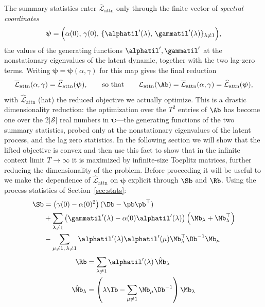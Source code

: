 \documentclass{article}
\begin{document}
The summary statistics enter $\overline{\mathcal{L}}_{\text{attn}}$ only through
the finite vector of \emph{spectral coordinates}
\begin{equation}\label{psi}
    \boldsymbol{\psi}
    = \Big(\alpha(0),\,\gamma(0),\,
      \{\alphatil'(\lambda),\,\gammatil'(\lambda)\}_{\lambda\neq 1}\Big),
\end{equation}
the values of the generating functions $\alphatil',\gammatil'$ at the
nonstationary eigenvalues of the latent dynamic, together with the two lag-zero
terms. Writing $\boldsymbol{\psi} = \boldsymbol{\psi}(\alpha,\gamma)$ for this
map gives the final reduction
\begin{equation}\label{reduce}
    \overline{\mathcal{L}}_{\text{attn}}(\alpha,\gamma)
    = \widehat{\mathcal{L}}_{\text{attn}}(\boldsymbol{\psi}),
    \qquad\text{so that}\qquad
    \mathcal{L}_{\text{attn}}(\Ab)
    = \overline{\mathcal{L}}_{\text{attn}}(\alpha,\gamma)
    = \widehat{\mathcal{L}}_{\text{attn}}(\boldsymbol{\psi}),
\end{equation}
with $\widehat{\mathcal{L}}_{\text{attn}}$ (hat) the reduced objective we
actually optimize. This is a drastic dimensionality reduction: the optimization over
the $T^2$ entries of $\Ab$ has become one over the $2|\mathcal{S}|$ real numbers
in $\boldsymbol{\psi}$---the generating functions of the two summary statistics,
probed only at the nonstationary eigenvalues of the latent process, and the lag zero statistics. In the following section we will show that the lifted objective is convex and then use this fact to show that in the infinite context limit $T \to \infty$ it is maximized by infinite-size Toeplitz matrices, further reducing the dimensionality of the problem. Before proceeding it will be useful to we make the
dependence of $\widehat{\mathcal{L}}_{\text{attn}}$ on $\boldsymbol{\psi}$
explicit through $\Sb$ and $\Rb$. Using the process statistics of Section~\ref{sec:stats}: 
\begin{align}\label{s}
      \Sb &= \left(\gamma(0) - \alpha(0)^2\right)(\Db - \pb\pb^\top)\\
      &+ \sum_{\lambda \neq 1}\left( \gammatil'(\lambda) - \alpha(0)\alphatil'(\lambda)\right )
         \left( \Mb_\lambda + \Mb_\lambda^\top\right) \\
      &- \sum_{\mu\neq 1,\, \lambda\neq 1} \alphatil'(\lambda)\alphatil'(\mu)
         \Mb_\lambda^\top \Db^{-1}\Mb_\mu
\end{align}
\begin{align}
     \Rb &= \sum_{\lambda \neq 1}\alphatil'(\lambda)\, \hat{\Mb}_\lambda \\
     \hat{\Mb}_\lambda &= \left(\lambda\Ib - \sum_{\mu\neq1}\Mb_\mu\Db^{-1}\right)\Mb_\lambda
\end{align}
\end{document}
